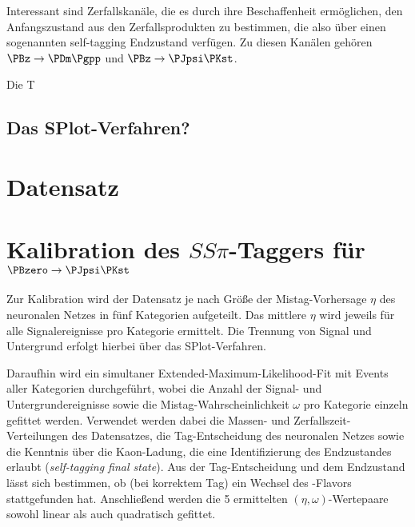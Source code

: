 
Interessant sind Zerfallskanäle, die es durch ihre Beschaffenheit ermöglichen, den Anfangszustand aus den Zerfallsprodukten zu bestimmen, die also über einen sogenannten self-tagging Endzustand verfügen.
Zu diesen Kanälen gehören $\PBz \to \PDm \Pgpp$ und $\PBz \to \PJpsi \PKst$.

Die T


\subsection{Das SPlot-Verfahren?}

\section{Datensatz}


\section{\texorpdfstring{Kalibration des $SS\pi$-Taggers für $\PBzero \to \PJpsi \PKst$}{Kalibration des SSpi-Taggers für B0 -> JpsiKst}}

Zur Kalibration wird der Datensatz je nach Größe der Mistag-Vorhersage $\eta$ des neuronalen Netzes in fünf Kategorien aufgeteilt.
Das mittlere $η$ wird jeweils für alle Signalereignisse pro Kategorie ermittelt. Die Trennung von Signal und Untergrund erfolgt hierbei über das SPlot-Verfahren.

Daraufhin wird ein simultaner Extended-Maximum-Likelihood-Fit mit Events aller Kategorien durchgeführt, wobei die Anzahl der Signal- und Untergrundereignisse sowie die Mistag-Wahrscheinlichkeit $\omega$ pro Kategorie einzeln gefittet werden.
Verwendet werden dabei die Massen- und Zerfallszeit-Verteilungen des Datensatzes, die Tag-Entscheidung des neuronalen Netzes sowie die Kenntnis über die Kaon-Ladung, die eine Identifizierung des Endzustandes erlaubt (\emph{self-tagging final state}).
Aus der Tag-Entscheidung und dem Endzustand lässt sich bestimmen, ob (bei korrektem Tag) ein Wechsel des \Pqb-Flavors stattgefunden hat.
Anschließend werden die 5 ermittelten $(\eta, \omega)$-Wertepaare sowohl linear als auch quadratisch gefittet.


